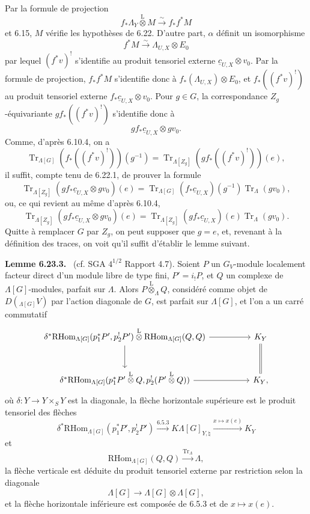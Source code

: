 \documentclass[11pt]{article}
\newenvironment{statement}[1]{\par\medskip\noindent\textbf{#1.}\ }{\par\medskip}
\providecommand{\RHom}{\mathrm{RHom}}
\providecommand{\Tr}{\operatorname{Tr}}
\providecommand{\Tr}{\operatorname{Tr}}
\providecommand{\lten}{\overset{\mathrm L}{\otimes}}
\providecommand{\Tr}{\operatorname{Tr}}
\providecommand{\RHom}{\mathrm{RHom}}
\providecommand{\lten}{\overset{\mathrm L}{\otimes}}
\providecommand{\RHom}{\mathrm R\mathcal{H}om}
\providecommand{\lten}{\overset{\mathrm L}{\otimes}}
\providecommand{\Tr}{\operatorname{Tr}}
\providecommand{\lten}{\overset{\mathrm L}{\otimes}}
\providecommand{\lten}{\overset{\mathrm L}{\otimes}}
\providecommand{\lten}{\overset{\mathrm L}{\otimes}}
\begin{document}
Par la formule de projection
\[
f_*\Lambda_Y\lten M\xrightarrow{\sim}f_*f^*M
\]
et 6.15, $M$ vérifie les hypothèses de 6.22. D'autre part, $\alpha$ définit un isomorphisme
\[
f^*M\xrightarrow{\sim}\Lambda_{U,X}\otimes E_0
\]
par lequel $(f^*v)^!$ s'identifie au produit tensoriel externe $\underline c_{U,X}\otimes v_0$. Par la formule de projection, $f_*f^*M$ s'identifie donc à $f_*(\Lambda_{U,X})\otimes E_0$, et $f_*((f^*v)^!)$ au produit tensoriel externe $f_*\underline c_{U,X}\otimes v_0$. Pour $g\in G$, la correspondance $Z_g$-équivariante $gf_*((f^*v)^!)$ s'identifie donc à
\[
gf_*\underline c_{U,X}\otimes gv_0.
\]
Comme, d'après 6.10.4, on a
\[
\Tr_{\Lambda[G]}(f_*((f^*v)^!))(g^{-1})
=
\Tr_{\Lambda[Z_g]}(gf_*((f^*v)^!))(e),
\]
il suffit, compte tenu de 6.22.1, de prouver la formule
\[
\Tr_{\Lambda[Z_g]}(gf_*\underline c_{U,X}\otimes gv_0)(e)
=
\Tr_{\Lambda[G]}(f_*\underline c_{U,X})(g^{-1})\Tr_{\Lambda}(gv_0),
\]
ou, ce qui revient au même d'après 6.10.4,
\begin{equation}
\Tr_{\Lambda[Z_g]}(gf_*\underline c_{U,X}\otimes gv_0)(e)
=
\Tr_{\Lambda[Z_g]}(gf_*\underline c_{U,X})(e)\Tr_{\Lambda}(gv_0).
\tag{6.23.2}
\end{equation}
Quitte à remplacer $G$ par $Z_g$, on peut supposer que $g=e$, et, revenant à la définition des traces, on voit qu'il suffit d'établir le lemme suivant.

\begin{statement}{Lemme 6.23.3}
(cf. SGA $4^{1/2}$ Rapport 4.7). Soient $P$ un $G_V$-module localement facteur direct d'un module libre de type fini, $P'=i_!P$, et $Q$ un complexe de $\Lambda[G]$-modules, parfait sur $\Lambda$. Alors $P\lten_{\Lambda}Q$, considéré comme objet de $D({}_{\Lambda[G]}V)$ par l'action diagonale de $G$, est parfait sur $\Lambda[G]$, et l'on a un carré commutatif
\[
\begin{tikzcd}[column sep=huge,row sep=large]
\delta^*\RHom_{\Lambda[G]}(p_1^*P',p_2^!P')\lten
\RHom_{\Lambda[G]}(Q,Q) \arrow[r] \arrow[d]
& K_Y \arrow[d,equal]\\
\delta^*\RHom_{\Lambda[G]}(p_1^*P'\lten Q,p_2^!(P'\lten Q)) \arrow[r]
& K_Y ,
\end{tikzcd}
\]
où $\delta:Y\to Y\times_SY$ est la diagonale, la flèche horizontale supérieure est le produit tensoriel des flèches
\[
\delta^*\RHom_{\Lambda[G]}(p_1^*P',p_2^!P')\xrightarrow{6.5.3}
K\Lambda[G]_{Y,\natural}\xrightarrow{x\mapsto x(e)}K_Y
\]
et
\[
\RHom_{\Lambda[G]}(Q,Q)\xrightarrow{\Tr_{\Lambda}}\Lambda,
\]
la flèche verticale est déduite du produit tensoriel externe par restriction selon la diagonale
\[
\Lambda[G]\to\Lambda[G]\otimes\Lambda[G],
\]
et la flèche horizontale inférieure est composée de 6.5.3 et de $x\mapsto x(e)$.
\end{statement}
\end{document}

